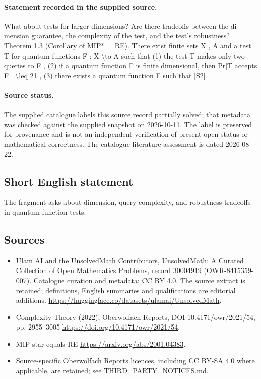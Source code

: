 \documentclass[11pt]{article}
\newcommand{\sref}[2]{\hyperlink{source:#1:#2}{[S#2]}}
\begin{document}
\paragraph{Statement recorded in the supplied source.}
What about tests for larger dimensions? Are there tradeoffs between the di- mension guarantee, the complexity of the test, and the test’s robustness? Theorem 1.3 (Corollary of MIP* = RE). There exist finite sets X , A and a test T for quantum functions F : X \textbackslash{}to A such that (1) the test T makes only two queries to F , (2) if a quantum function F is finite dimensional, then Pr[T accepts F ] \textbackslash{}leq 21 , (3) there exists a quantum function F such that \sref{30004919}{2}
\paragraph{Source status.}
The supplied catalogue labels this source record partially solved; that metadata was checked against the supplied snapshot on 2026-10-11. The label is preserved for provenance and is not an independent verification of present open status or mathematical correctness. The catalogue literature assessment is dated 2026-08-22.
\subsection{Short English statement}
The fragment asks about dimension, query complexity, and robustness tradeoffs in quantum-function tests.
\subsection{Sources}
\begin{itemize}
\item[\hypertarget{source:30004919:1}{S1}] Ulam AI and the UnsolvedMath Contributors, UnsolvedMath: A Curated Collection of Open Mathematics Problems, record 30004919 (OWR-8415359-007). Catalogue curation and metadata: CC BY 4.0. The source extract is retained; definitions, English summaries and qualifications are editorial additions.
\url{https://huggingface.co/datasets/ulamai/UnsolvedMath}.
\item[\hypertarget{source:30004919:2}{S2}] Complexity Theory (2022), Oberwolfach Reports, DOI 10.4171/owr/2021/54, pp. 2955--3005
\url{https://doi.org/10.4171/owr/2021/54}.
\item[\hypertarget{source:30004919:3}{S3}] MIP star equals RE
\url{https://arxiv.org/abs/2001.04383}.
\item Source-specific Oberwolfach Reports licences, including CC BY-SA 4.0 where applicable, are retained; see THIRD\_PARTY\_NOTICES.md.
\end{itemize}
\end{document}
